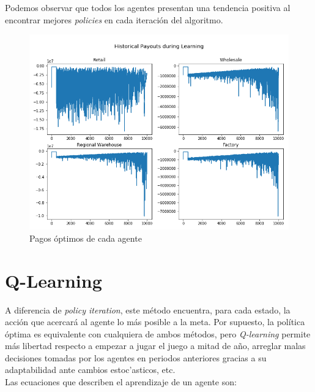 Podemos observar que todos los agentes presentan una tendencia positiva al encontrar mejores \textit{policies} en cada iteraci\'on del algoritmo.

\begin{figure}[ht]
\caption{Pagos \'optimos de cada agente}
\label{politer_payouts}
\includegraphics[width=15cm]{tesis_tex/figs/policyiteration_payouts.png}
\centering
\end{figure}

\section{Q-Learning}

A diferencia de \textit{policy iteration}, este m\'etodo encuentra, para cada estado, la acci\'on que acercar\'a al agente lo m\'as posible a la meta. Por supuesto, la pol\'itica \'optima es equivalente con cualquiera de ambos m\'etodos, pero \textit{Q-learning} permite m\'as libertad respecto a empezar a jugar el juego a mitad de a\~no, arreglar malas decisiones tomadas por los agentes en periodos anteriores gracias a su adaptabilidad ante cambios estoc'asticos, etc.\\

Las ecuaciones que describen el aprendizaje de un agente son:

